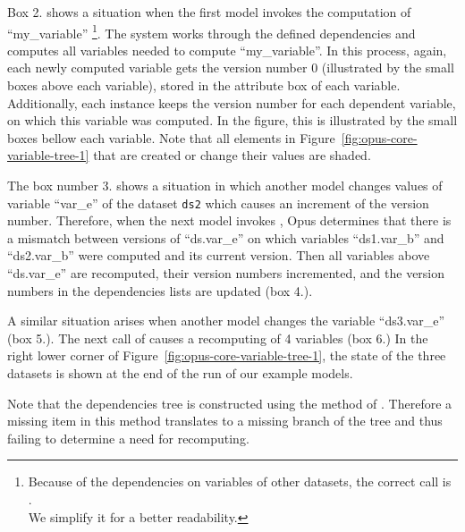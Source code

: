 {\begin{figure}
\begin{center}
\end{center}
\end{figure}

Box 2. shows a situation when the first model invokes the computation of
``my_variable'' \variablesindex \footnote{Because of the dependencies on variables of other
  datasets, the correct call is\\
  .\\
  We simplify it for
  a better readability.}. The system works through the defined dependencies and
computes all variables \variablesindex needed to compute ``my_variable''. \variablesindex In this process,
again, each newly computed variable \variablesindex gets the version number 0 (illustrated by
the small boxes above each variable), \variablesindex stored in the attribute \attributesindex box of each
variable. \variablesindex Additionally, each  \variablesindex instance keeps the version
number for each dependent variable, \variablesindex on which this variable \variablesindex was computed. In
the figure, this is illustrated by the small boxes bellow each variable. \variablesindex
Note that all elements in Figure~\ref{fig:opus-core-variable-tree-1} that are
created or change their values are shaded.

The box number 3. shows a situation in which another model changes values of
variable ``var_e'' of the dataset \datasetindex \verb|ds2| which causes an increment of the
version number. Therefore, when the next model invokes
, \variablesindex Opus determines that there is a
mismatch between versions of ``ds.var_e'' on which variables \variablesindex ``ds1.var_b'' and
``ds2.var_b'' were computed and its current version. Then all
variables \variablesindex above ``ds.var_e'' are recomputed, their version numbers
incremented, and the version numbers in the dependencies lists are updated
(box 4.).

A similar situation arises when another model changes the variable \variablesindex
``ds3.var_e'' (box 5.). The next call of
 \variablesindex causes a recomputing of 4
variables \variablesindex (box 6.) In the right lower corner of
Figure~\ref{fig:opus-core-variable-tree-1}, the state of the three datasets \datasetindex is
shown at the end of the run of our example models.

Note that the dependencies tree is constructed using the
 method of . \variablesindex Therefore a missing item
in this method translates to a missing branch of the tree and thus failing to
determine a need for recomputing.

}
